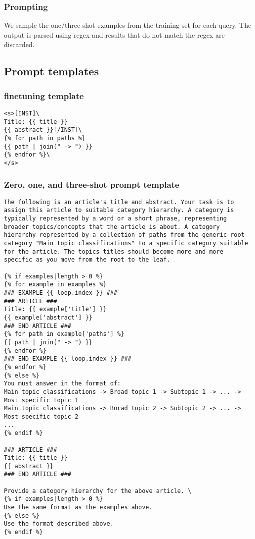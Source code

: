 \subsubsection{Prompting}
We sample the one/three-shot examples from the training set for each query. The output is parsed using regex and results that do not match the regex are discarded.  

\newpage
\subsection{Prompt templates}  \label{appendix:prompt-template}

\subsubsection*{\name finetuning template}

\begin{lstlisting}[frame=single]
<s>[INST]\
Title: {{ title }}
{{ abstract }}[/INST]\
{% for path in paths %}
{{ path | join(" -> ") }}
{% endfor %}\
</s>
\end{lstlisting}

\subsubsection*{Zero, one, and three-shot prompt template}

\begin{lstlisting}[frame=single]
The following is an article's title and abstract. Your task is to assign this article to suitable category hierarchy. A category is typically represented by a word or a short phrase, representing broader topics/concepts that the article is about. A category hierarchy represented by a collection of paths from the generic root category "Main topic classifications" to a specific category suitable for the article. The topics titles should become more and more specific as you move from the root to the leaf. 

{% if examples|length > 0 %}
{% for example in examples %}
### EXAMPLE {{ loop.index }} ###
### ARTICLE ###
Title: {{ example['title'] }}
{{ example['abstract'] }}
### END ARTICLE ###
{% for path in example['paths'] %}
{{ path | join(" -> ") }}
{% endfor %}
### END EXAMPLE {{ loop.index }} ###
{% endfor %}
{% else %}
You must answer in the format of:
Main topic classifications -> Broad topic 1 -> Subtopic 1 -> ... -> Most specific topic 1
Main topic classifications -> Borad topic 2 -> Subtopic 2 -> ... -> Most specific topic 2
...
{% endif %}

### ARTICLE ###
Title: {{ title }}
{{ abstract }}
### END ARTICLE ###

Provide a category hierarchy for the above article. \
{% if examples|length > 0 %}
Use the same format as the examples above.
{% else %}
Use the format described above.
{% endif %}
\end{lstlisting}

